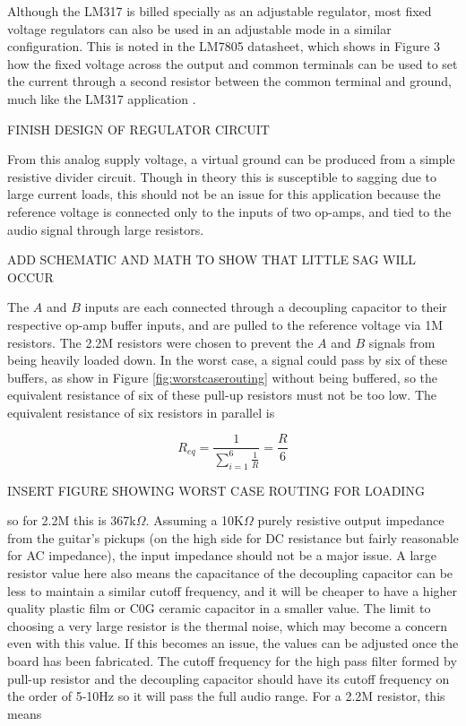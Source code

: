 \documentclass{article}
\begin{document}
	Although the LM317 is billed specially as an adjustable regulator, most fixed voltage regulators can also be used in an adjustable mode in a similar configuration.  This is noted in the LM7805 datasheet, which shows in Figure 3 how the fixed voltage across the output and common terminals can be used to set the current through a second resistor between the common terminal and ground, much like the LM317 application \cite{datasheet:LM7805}.

	FINISH DESIGN OF REGULATOR CIRCUIT

	From this analog supply voltage, a virtual ground can be produced from a simple resistive divider circuit.  Though in theory this is susceptible to sagging due to large current loads, this should not be an issue for this application because the reference voltage is connected only to the inputs of two op-amps, and tied to the audio signal through large resistors.

	ADD SCHEMATIC AND MATH TO SHOW THAT LITTLE SAG WILL OCCUR

	The $A$ and $B$ inputs are each connected through a decoupling capacitor to their respective op-amp buffer inputs, and are pulled to the reference voltage via 1M resistors.  The 2.2M resistors were chosen to prevent the $A$ and $B$ signals from being heavily loaded down.  In the worst case, a signal could pass by six of these buffers, as show in Figure \ref{fig:worstcaserouting} without being buffered, so the equivalent resistance of six of these pull-up resistors must not be too low.  The equivalent resistance of six resistors in parallel is

	$$ R_{eq} = \frac{1}{\sum\limits_{i=1}^{6}\frac{1}{R}} = \frac{R}{6} $$

	INSERT FIGURE SHOWING WORST CASE ROUTING FOR LOADING

	so for 2.2M this is 367k$\Omega$.  Assuming a 10K$\Omega$ purely resistive output impedance from the guitar's pickups (on the high side for DC resistance but fairly reasonable for AC impedance), the input impedance should not be a major issue.  A large resistor value here also means the capacitance of the decoupling capacitor can be less to maintain a similar cutoff frequency, and it will be cheaper to have a higher quality plastic film or C0G ceramic capacitor in a smaller value.  The limit to choosing a very large resistor is the thermal noise, which may become a concern even with this value.  If this becomes an issue, the values can be adjusted once the board has been fabricated.  The cutoff frequency for the high pass filter formed by pull-up resistor and the decoupling capacitor should have its cutoff frequency on the order of 5-10Hz so it will pass the full audio range.  For a 2.2M resistor, this means
\end{document}
